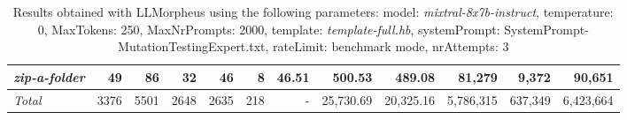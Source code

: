 \begin{table*}
{\begin{tabular}{l||r|r|r|r|r|r||r|r||r|r|r}
   \hline
   \textit{zip-a-folder} & 49 & 86 & 32 & 46 & 8 & 46.51 & 500.53 & 489.08 & 81,279 & 9,372 & 90,651 \\ 
   \hline
   \textit{Total} & 3376 & 5501 & 2648 & 2635 & 218 & - & 25,730.69  & 20,325.16 & 5,786,315 & 637,349 & 6,423,664 \\ 
 \end{tabular}
 }
 \caption{Results obtained with LLMorpheus using the following parameters: 
   model: \textit{mixtral-8x7b-instruct}, 
   temperature: 0, 
   MaxTokens: 250, 
   MaxNrPrompts: 2000, 
   template: \textit{template-full.hb}, 
   systemPrompt: SystemPrompt-MutationTestingExpert.txt, 
   rateLimit: benchmark mode, 
   nrAttempts: 3  
 }
\end{table*}

